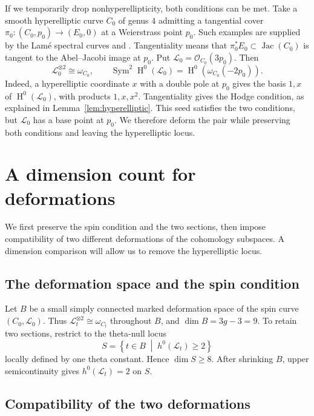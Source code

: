 \documentclass{amsart}
\DeclareMathOperator{\Sym}{Sym}
\DeclareMathOperator{\Hnm}{H}
\DeclareMathOperator{\Jac}{Jac}
\begin{document}
If we temporarily drop nonhyperellipticity, both conditions can be met.
Take a smooth hyperelliptic curve $C_0$ of genus $4$ admitting a
tangential cover $\pi_0:(C_0,p_0)\longrightarrow(E_0,0)$ at a Weierstrass
point $p_0$. Such examples are supplied by the Lam\'e spectral curves
\cite[Table~3 and Theorem~L]{maier} and \cite[Proposition~3.1]{eilbeck}.
Tangentiality means that $\pi_0^*E_0\subset\Jac(C_0)$ is tangent to the
Abel--Jacobi image at $p_0$. Put
$\mathcal{L}_0=\mathcal{O}_{C_0}(3p_0)$. Then
\[
\mathcal{L}_0^{\otimes2}\cong\omega_{C_0},\qquad
\Sym^2\Hnm^0(\mathcal{L}_0)
=\Hnm^0\left(\omega_{C_0}(-2p_0)\right).
\]
Indeed, a hyperelliptic coordinate $x$ with a double pole at $p_0$ gives
the basis $1,x$ of $\Hnm^0(\mathcal{L}_0)$, with products $1,x,x^2$.
Tangentiality gives the Hodge condition, as explained in
Lemma~\ref{lem:hyperelliptic}. This seed satisfies the two conditions,
but $\mathcal{L}_0$ has a base point at $p_0$. We therefore deform the
pair while preserving both conditions and leaving the hyperelliptic
locus.

\section{A dimension count for deformations}

We first preserve the spin condition and the two sections, then impose
compatibility of two different deformations of the cohomology subspaces.
A dimension comparison will allow us to remove the hyperelliptic locus.

\subsection{The deformation space and the spin condition}\label{subsec:spin}

Let $B$ be a small simply connected marked deformation space of the spin
curve $(C_0,\mathcal{L}_0)$. Thus
$\mathcal{L}_t^{\otimes2}\cong\omega_{C_t}$ throughout $B$, and
$\dim B=3g-3=9$. To retain two sections, restrict to the theta-null locus
\[
S=\left\{t\in B\;\middle|\;h^0(\mathcal{L}_t)\geqslant2\right\}
\]
locally defined by one theta constant. Hence $\dim S\geqslant8$.
After shrinking $B$, upper semicontinuity gives
$h^0(\mathcal{L}_t)=2$ on $S$.

\subsection{Compatibility of the two deformations}\label{subsec:compatibility}
\end{document}
